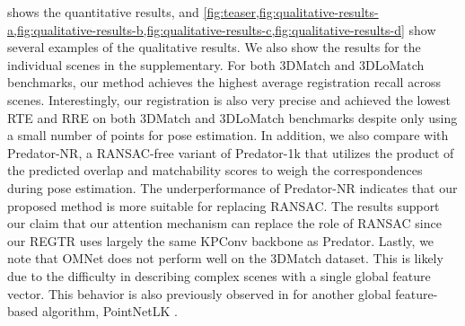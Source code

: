 \documentclass[10pt,twocolumn,letterpaper]{article}
\begin{document}
 shows the quantitative results, and \cref{fig:teaser,fig:qualitative-results-a,fig:qualitative-results-b,fig:qualitative-results-c,fig:qualitative-results-d} show several examples of the qualitative results. We also show the results for the individual scenes in the supplementary. For both 3DMatch and 3DLoMatch benchmarks, our method achieves the highest average registration recall across scenes. Interestingly, our registration is also very precise and achieved the lowest RTE and RRE on both 3DMatch and 3DLoMatch benchmarks despite only using a small number of points for pose estimation.
In addition, we also compare with Predator-NR, a RANSAC-free variant of Predator-1k that utilizes the product of the predicted overlap and matchability scores to weigh the correspondences during pose estimation. The underperformance of Predator-NR indicates that our proposed method is more suitable for replacing RANSAC.
The results support our claim that our attention mechanism can replace the role of RANSAC since our REGTR uses largely the same KPConv backbone as Predator.
Lastly, we note that OMNet does not perform well on the 3DMatch dataset. This is likely due to the difficulty in describing complex scenes with a single global feature vector. This behavior is also previously observed in \cite{choy2020dgr} for another global feature-based algorithm, PointNetLK \cite{aoki2019pointnetlk}.
\end{document}

